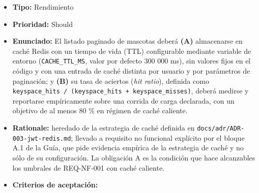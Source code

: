 \documentclass[
  spanish,
]{article}
\providecommand{\tightlist}{%
  \setlength{\itemsep}{0pt}\setlength{\parskip}{0pt}}
\begin{document}
\begin{itemize}
\tightlist
\item
  \textbf{Tipo:} Rendimiento
\item
  \textbf{Prioridad:} Should
\item
  \textbf{Enunciado:} El listado paginado de mascotas deberá
  \textbf{(A)} almacenarse en caché Redis con un tiempo de vida (TTL)
  configurable mediante variable de entorno (\texttt{CACHE\_\allowbreak{}TTL\_\allowbreak{}MS},
  valor por defecto 300 000 ms), sin valores fijos en el código y con
  una entrada de caché distinta por usuario y por parámetros de
  paginación; y \textbf{(B)} su tasa de aciertos (\emph{hit ratio}),
  definida como
  \texttt{keyspace\_\allowbreak{}hits\ /\allowbreak{}\ (keyspace\_\allowbreak{}hits\ +\ ke\allowbreak{}yspace\_\allowbreak{}misses)},
  deberá medirse y reportarse empíricamente sobre una corrida de carga
  declarada, con un objetivo de al menos 80 \% en régimen de caché
  caliente.
\item
  \textbf{Rationale:} heredado de la estrategia de caché definida en
  \texttt{docs/\allowbreak{}adr/\allowbreak{}ADR-\allowbreak{}003-\allowbreak{}jwt-\allowbreak{}redis.\allowbreak{}md}; llevado a requisito no
  funcional explícito por el bloque A.1 de la Guía, que pide evidencia
  empírica de la estrategia de caché y no sólo de su configuración. La
  obligación A es la condición que hace alcanzables los umbrales de
  REQ-NF-001 con caché caliente.
\item
  \textbf{Criterios de aceptación:}


\end{itemize}
\end{document}
